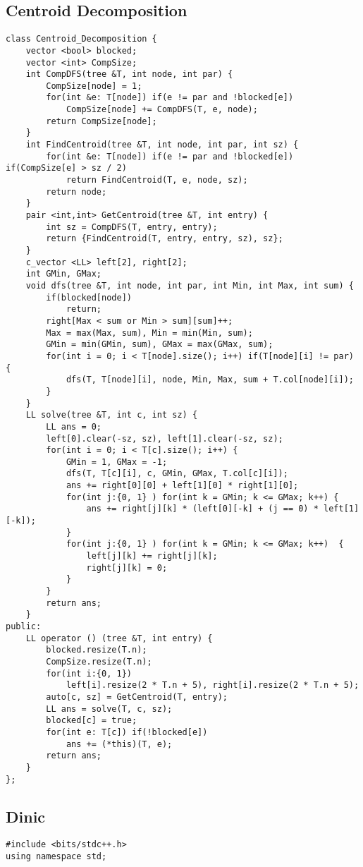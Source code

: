 \documentclass[FSZ,a4paper,onesided]{article}
\begin{document}
\begin{multicols*}{\COLS}
\subsection{Centroid Decomposition}
\begin{lstlisting}
class Centroid_Decomposition {
    vector <bool> blocked;
    vector <int> CompSize;
    int CompDFS(tree &T, int node, int par) {
        CompSize[node] = 1;
        for(int &e: T[node]) if(e != par and !blocked[e])
            CompSize[node] += CompDFS(T, e, node);
        return CompSize[node];
    }
    int FindCentroid(tree &T, int node, int par, int sz) {
        for(int &e: T[node]) if(e != par and !blocked[e]) if(CompSize[e] > sz / 2)
            return FindCentroid(T, e, node, sz);
        return node;
    }
    pair <int,int> GetCentroid(tree &T, int entry) {
        int sz = CompDFS(T, entry, entry);
        return {FindCentroid(T, entry, entry, sz), sz};
    }
    c_vector <LL> left[2], right[2]; 
    int GMin, GMax;
    void dfs(tree &T, int node, int par, int Min, int Max, int sum) {
        if(blocked[node])
            return;
        right[Max < sum or Min > sum][sum]++;
        Max = max(Max, sum), Min = min(Min, sum);
        GMin = min(GMin, sum), GMax = max(GMax, sum);
        for(int i = 0; i < T[node].size(); i++) if(T[node][i] != par) {
            dfs(T, T[node][i], node, Min, Max, sum + T.col[node][i]);
        }
    }
    LL solve(tree &T, int c, int sz) {
        LL ans = 0;
        left[0].clear(-sz, sz), left[1].clear(-sz, sz);
        for(int i = 0; i < T[c].size(); i++) {
            GMin = 1, GMax = -1;
            dfs(T, T[c][i], c, GMin, GMax, T.col[c][i]);
            ans += right[0][0] + left[1][0] * right[1][0];
            for(int j:{0, 1} ) for(int k = GMin; k <= GMax; k++) {
                ans += right[j][k] * (left[0][-k] + (j == 0) * left[1][-k]);
            }
            for(int j:{0, 1} ) for(int k = GMin; k <= GMax; k++)  {
                left[j][k] += right[j][k];
                right[j][k] = 0;
            }
        }
        return ans;
    }
public:
    LL operator () (tree &T, int entry) {
        blocked.resize(T.n);
        CompSize.resize(T.n);
        for(int i:{0, 1})
            left[i].resize(2 * T.n + 5), right[i].resize(2 * T.n + 5);
        auto[c, sz] = GetCentroid(T, entry);
        LL ans = solve(T, c, sz);
        blocked[c] = true;
        for(int e: T[c]) if(!blocked[e])
            ans += (*this)(T, e);
        return ans;
    }   
};\end{lstlisting}
\subsection{Dinic}
\begin{lstlisting}
#include <bits/stdc++.h>
using namespace std;


\end{lstlisting}
\end{multicols*}
\end{document}
